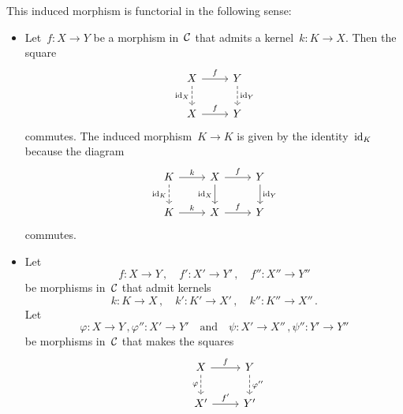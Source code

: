 \begin{remark*}
\begin{enumerate}
      This induced morphism is functorial in the following sense:
      \begin{itemize}
        \item
          Let~$f \colon X \to Y$ be a morphism in~$\mathcal{C}$ that admits a kernel~$k \colon K \to X$.
          Then the square
          \[
            \begin{tikzcd}
                X
                \arrow{r}[above]{f}
                \arrow[dashed]{d}[left]{\id_X}
              & Y
                \arrow[dashed]{d}[right]{\id_Y}
              \\
                X
                \arrow{r}[above]{f}
              & Y
            \end{tikzcd}
          \]
          commutes.
          The induced morphism~$K \to K$ is given by the identity~$\operatorname{id}_K$ because the diagram
          \[
            \begin{tikzcd}
                K
                \arrow{r}[above]{k}
                \arrow[dashed]{d}[left]{\id_K}
              & X
                \arrow{r}[above]{f}
                \arrow{d}[left]{\id_X}
              & Y
                \arrow{d}[right]{\id_Y}
              \\
                K
                \arrow{r}[above]{k}
              & X
                \arrow{r}[above]{f}
              & Y
            \end{tikzcd}
          \]
          commutes.
        \item
          Let
          \[
            f \colon X \to Y \,,
            \quad
            f' \colon X' \to Y' \,,
            \quad
            f'' \colon X'' \to Y''
          \]
          be morphisms in~$\mathcal{C}$ that admit kernels
          \[ 
            k \colon K \to X \,,
            \quad
            k' \colon K' \to X' \,,
            \quad
            k'' \colon K'' \to X'' \,.
          \]
          Let
          \[
            \varphi \colon X \to Y \,,
            \varphi'' \colon X' \to Y'
            \quad\text{and}\quad
            \psi \colon X' \to X'' \,,
            \psi'' \colon Y' \to Y''
          \]
          be morphisms in~$\mathcal{C}$ that makes the squares
          \[
            \begin{tikzcd}
              & X
                \arrow{r}[above]{f}
                \arrow[dashed]{d}[left]{\varphi}
              & Y
                \arrow[dashed]{d}[right]{\varphi''}
              \\
              & X'
                \arrow{r}[above]{f'}
              & Y'

\end{tikzcd}\]
\end{itemize}
\end{enumerate}
\end{remark*}
